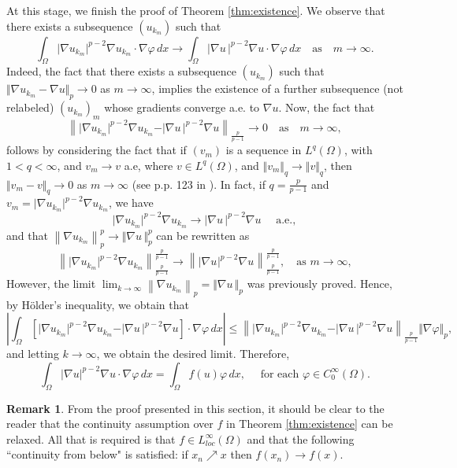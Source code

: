 \documentclass[11pt]{amsart}
\theoremstyle{definition}
\newtheorem{remark}[theorem]{Remark}
\begin{document}
    At this stage, we finish the proof of Theorem \ref{thm:existence}. We observe that there exists a subsequence $(u_{k_m})$ such that
    $$\int_\Omega\vert\nabla u_{k_m}\vert^{p-2}\nabla u_{k_m}\cdot\nabla\varphi\, dx\to\int_\Omega\vert\nabla u\,\vert^{p-2}\nabla u\cdot\nabla\varphi\,dx\quad\text{as}\quad m\to\infty.$$
    Indeed, the fact that there exists a subsequence $(u_{k_m})$ such that $\Vert \nabla u_{k_m}-\nabla u\Vert_p\to 0$ as $m\to\infty$, implies the existence of a further subsequence (not relabeled) $(u_{k_m})_m$ whose gradients converge a.e. to $\nabla u$. Now, the fact that 
    $$\left\|\vert\nabla u_{k_m}\vert^{p-2}\nabla u_{k_m}-\vert\nabla u\,\vert^{p-2}\nabla u\right\|_{\frac{p}{p-1}}\to 0\quad\text{as}\quad m\to\infty,$$ 
    follows by considering the fact that if $(v_m)$ is a sequence in $L^q(\Omega)$, with $1<q<\infty$, and $v_m\to v$ a.e, where $v\in L^q(\Omega)$, and $\Vert v_m\Vert_q\to\Vert v\Vert_q$, then $\Vert v_m-v\Vert_q\to0$ as $m\to\infty$ (see p.p. 123 in \cite{BrezisBook}). In fact, if $q=\frac{p}{p-1}$ and $v_m=\vert\nabla u_{k_m}\vert^{p-2}\nabla u_{k_m}$, we have
    $$\vert\nabla u_{k_m}\vert^{p-2}\nabla u_{k_m}\to\vert\nabla u\,\vert^{p-2}\nabla u\quad\text{ a.e.},$$ and that
    $\left\|\nabla u_{k_m}\right\|_p^p\to\Vert\nabla u\,\Vert_p^p$ can be rewritten as
    $$\left\| \vert\nabla u_{k_m}\vert^{p-2}\nabla u_{k_m} \right\|_{\frac{p}{p-1}}^{\frac{p}{p-1}}\to \left\| \vert\nabla u_{}\vert^{p-2}\nabla u_{} \right\|_{\frac{p}{p-1}}^{\frac{p}{p-1}},\quad\text{as }m\to\infty,$$
   However, the limit $\lim_{k\to\infty}\left\|\nabla u_{k_m}\right\|_p=\Vert\nabla u\,\Vert_p$ was previously proved. Hence, by H\"older's inequality, we obtain that
    $$
         \left|\int_\Omega\left[\vert\nabla u_{k_m}\vert^{p-2}\nabla u_{k_m}-\vert\nabla u\,\vert^{p-2}\nabla u\right]\cdot\nabla\varphi\, dx\right|\leq \left\|\vert\nabla u_{k_m}\vert^{p-2}\nabla u_{k_m}-\vert\nabla u\,\vert^{p-2}\nabla u\right\|_{\frac{p}{p-1}}\Vert\nabla\varphi\Vert_{p},
    $$
    and letting $k\to\infty$, we obtain the desired limit. Therefore,
    $$\int_\Omega\vert\nabla u\vert^{p-2}\nabla u\cdot\nabla\varphi\, dx=\int_\Omega f(u)\varphi\, dx,\quad\text{ for each }\varphi\in C_0^\infty(\Omega).$$

\begin{remark}
    From the proof presented in this section, it should be
    clear to the reader that the continuity assumption
    over $f$ in Theorem \ref{thm:existence} can be relaxed. All that is required
    is that $f\in L^{\infty}_{loc}\left(\Omega\right)$ and that
    the following ``continuity from below" is satisfied:
    if $x_n\nearrow x$ then 
    $f\left(x_n\right)\rightarrow f\left(x\right)$.
\end{remark}
\end{document}
